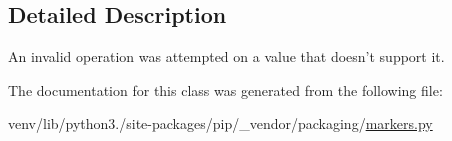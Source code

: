 \subsection{Detailed Description}
\begin{DoxyVerb}An invalid operation was attempted on a value that doesn't support it.
\end{DoxyVerb}
 

The documentation for this class was generated from the following file\+:\begin{DoxyCompactItemize}
\item 
venv/lib/python3./site-\/packages/pip/\+\_\+vendor/packaging/\hyperlink{pip_2__vendor_2packaging_2markers_8py}{markers.\+py}\end{DoxyCompactItemize}
